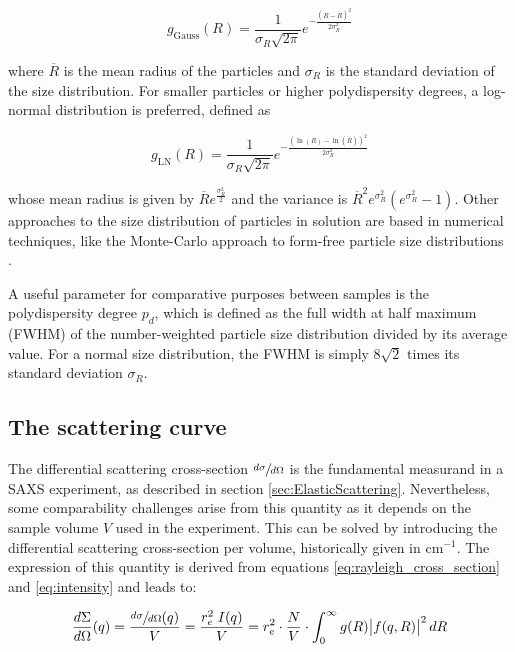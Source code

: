 \begin{equation}
        \label{eq:gauss_distribution}
       g_{\text{Gauss}}(R)=\frac{1}{\sigma_R \sqrt{2\pi}} e^{ - \frac{\left( R - \overline{R} \right)^2}{2\sigma_R^2} }
\end{equation}

where $\overline{R}$ is the mean radius of the particles and $\sigma_R$ is the standard deviation of the size distribution. For smaller particles or higher polydispersity degrees, a log-normal distribution is preferred, defined as

\begin{equation}
       g_{\text{LN}}(R)=\frac{1}{\sigma_R \sqrt{2\pi}} e^{ - \frac{\left( \ln(R) - \ln(\overline{R}) \right)^2}{2\sigma_R^2} }
\end{equation}

whose mean radius is given by $\overline{R} e^{\frac{\sigma_R^2}{2}}$ and the variance is $\overline{R}^2 e^{\sigma_R^2} (e^{\sigma_R^2} - 1)$. Other approaches to the size distribution of particles in solution are based in numerical techniques, like the Monte-Carlo approach to form-free particle size distributions \citep{pauw_improvements_2013}.

A useful parameter for comparative purposes between samples is the polydispersity degree $p_d$, which is defined as the full width at half maximum (FWHM) of the number-weighted particle size distribution divided by its average value. For a normal size distribution, the FWHM is simply $8\sqrt{2}$ times its standard deviation $\sigma_R$.

\subsection{The scattering curve}

The differential scattering cross-section $\sfrac{d\sigma}{d\Omega}$ is the fundamental measurand in a SAXS experiment, as described in section \ref{sec:ElasticScattering}. Nevertheless, some comparability challenges arise from this quantity as it depends on the sample volume $V$ used in the experiment. This can be solved by introducing the differential scattering cross-section per volume, historically given in cm$^{-1}$. The expression of this quantity is derived from equations \ref{eq:rayleigh_cross_section} and \ref{eq:intensity} and leads to:

\begin{equation}
\frac{d\Sigma}{d\Omega} (q) = \frac{\sfrac{d\sigma}{d\Omega}(q)}{V} = \frac{r_e^2 \; I(q)}{V} = r_e^2 \cdot \frac{N}{V} \cdot \int_0^{\infty} g(R) \abs{ f(q,R) }^2 dR
\end{equation}

